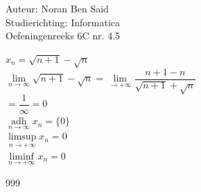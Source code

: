 \documentclass[a4paper]{article}
\begin{document}
  
\noindent \large Auteur: Noran Ben Said \\
\noindent \large Studierichting: Informatica\\
\noindent \large Oefeningenreeks 6C nr. 4.5\\

\medskip

\normalsize

$x_n = \sqrt{n+1} - \sqrt{n}$ \\

$\lim\limits_{n \to \infty} \sqrt{n+1} - \sqrt{n}
= \lim\limits_{\to +\infty} \dfrac{n+1 - n}{\sqrt{n+1} + \sqrt{n}}$\\

$= \dfrac{1}{\infty} = 0$\\

$\underset{n \to \infty}{\operatorname{adh}} x_n = \{0\}$ \\

$\limsup\limits_{n \to +\infty} x_n = 0 $\\

$\liminf\limits_{n \to +\infty} x_n = 0$ \\

\begin{thebibliography}{999}
\end{thebibliography}
\end{document}
